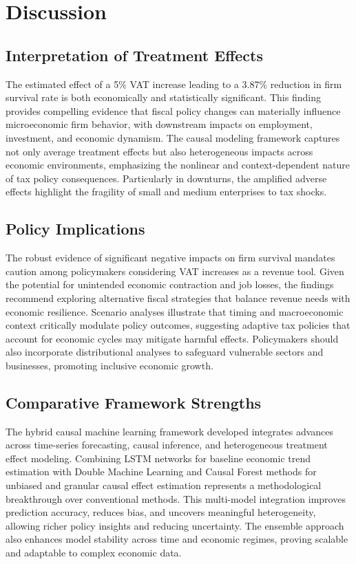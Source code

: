\section{Discussion}

\subsection{Interpretation of Treatment Effects}
The estimated effect of a 5\% VAT increase leading to a 3.87\% reduction in firm survival rate is both economically and statistically significant. This finding provides compelling evidence that fiscal policy changes can materially influence microeconomic firm behavior, with downstream impacts on employment, investment, and economic dynamism. The causal modeling framework captures not only average treatment effects but also heterogeneous impacts across economic environments, emphasizing the nonlinear and context-dependent nature of tax policy consequences. Particularly in downturns, the amplified adverse effects highlight the fragility of small and medium enterprises to tax shocks.

\subsection{Policy Implications}
The robust evidence of significant negative impacts on firm survival mandates caution among policymakers considering VAT increases as a revenue tool. Given the potential for unintended economic contraction and job losses, the findings recommend exploring alternative fiscal strategies that balance revenue needs with economic resilience. Scenario analyses illustrate that timing and macroeconomic context critically modulate policy outcomes, suggesting adaptive tax policies that account for economic cycles may mitigate harmful effects. Policymakers should also incorporate distributional analyses to safeguard vulnerable sectors and businesses, promoting inclusive economic growth.

\subsection{Comparative Framework Strengths}
The hybrid causal machine learning framework developed integrates advances across time-series forecasting, causal inference, and heterogeneous treatment effect modeling. Combining LSTM networks for baseline economic trend estimation with Double Machine Learning and Causal Forest methods for unbiased and granular causal effect estimation represents a methodological breakthrough over conventional methods. This multi-model integration improves prediction accuracy, reduces bias, and uncovers meaningful heterogeneity, allowing richer policy insights and reducing uncertainty. The ensemble approach also enhances model stability across time and economic regimes, proving scalable and adaptable to complex economic data.

